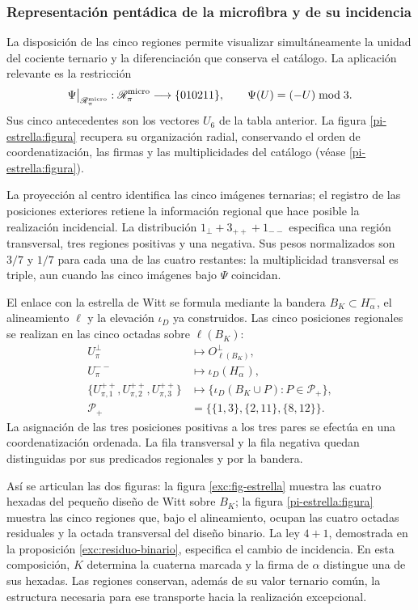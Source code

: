\subsubsection{Representación pentádica de la microfibra y de su incidencia}
\label{pi-estrella:desarrollo}

La disposición de las cinco regiones permite visualizar simultáneamente
la unidad del cociente ternario y la diferenciación que conserva el
catálogo. La aplicación relevante es la restricción
\[
 \Psi\big|_{\mathscr R_\pi^{\rm micro}}:
 \mathscr R_\pi^{\rm micro}\longrightarrow\{010211\},
 \qquad \Psi(U)=(-U)\bmod3.
\]
Sus cinco antecedentes son los vectores \(U_6\) de la tabla anterior.
La figura \ref{pi-estrella:figura} recupera su organización radial,
conservando el orden de coordenatización, las firmas y las multiplicidades del
catálogo (véase \ref{pi-estrella:figura}).



La proyección al centro identifica las cinco imágenes ternarias; el
registro de las posiciones exteriores retiene la información regional
que hace posible la realización incidencial. La distribución
\(1_\perp+3_{++}+1_{--}\) especifica una región transversal, tres
regiones positivas y una negativa. Sus pesos normalizados son
\(3/7\) y \(1/7\) para cada una de las cuatro restantes: la
multiplicidad transversal es triple, aun cuando las cinco imágenes bajo
\(\Psi\) coincidan.

El enlace con la estrella de Witt se formula mediante la bandera
\(B_K\subset H^-_\alpha\), el alineamiento \(\ell\) y la
elevación \(\iota_D\) ya construidos. Las cinco posiciones regionales
se realizan en las cinco octadas sobre \(\ell(B_K)\):
\[
\begin{aligned}
 U_\pi^\perp&\longmapsto O^\perp_{\ell(B_K)},\\
 U_\pi^{--}&\longmapsto\iota_D(H^-_\alpha),\\
 \{U_{\pi,1}^{++},U_{\pi,2}^{++},U_{\pi,3}^{++}\}
 &\longmapsto
 \{\iota_D(B_K\cup P):P\in\mathcal P_+\},\\
 \mathcal P_+&=\bigl\{\{1,3\},\{2,11\},\{8,12\}\bigr\}.
\end{aligned}
\]
La asignación de las tres posiciones positivas a los tres pares se
efectúa en una coordenatización ordenada. La fila transversal y la fila negativa
quedan distinguidas por sus predicados regionales y por la bandera.

Así se articulan las dos figuras: la figura
\ref{exc:fig-estrella} muestra las cuatro hexadas del pequeño diseño
de Witt sobre \(B_K\); la figura \ref{pi-estrella:figura} muestra
las cinco regiones que, bajo el alineamiento, ocupan las cuatro octadas
residuales y la octada transversal del diseño binario. La ley
\(4+1\), demostrada en la proposición
\ref{exc:residuo-binario}, especifica el cambio de incidencia. En esta
composición, \(K\) determina la cuaterna marcada y la firma de
\(\alpha\) distingue una de sus hexadas. Las regiones conservan,
además de su valor ternario común, la estructura necesaria para ese
transporte hacia la realización excepcional.
